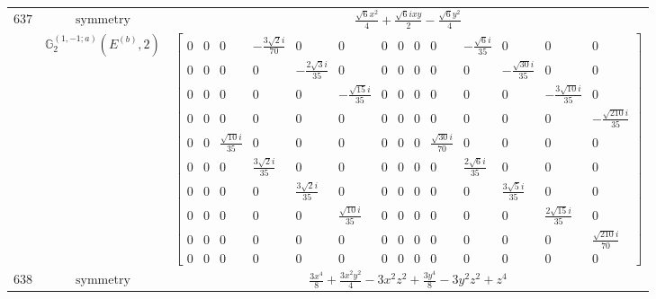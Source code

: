 \documentclass[fleqn,8pt,landscape]{jsarticle}
\begin{document}
\begin{longtable}{ccc}
$ 637 $ & $ \text{symmetry} $ & $ \frac{\sqrt{6} x^{2}}{4} + \frac{\sqrt{6} i x y}{2} - \frac{\sqrt{6} y^{2}}{4} $ \\
$  $ & $ \mathbb{G}_{2}^{(1,-1;a)}(E^{(b)},2) $ & $ \begin{bmatrix} 0 & 0 & 0 & - \frac{3 \sqrt{2} i}{70} & 0 & 0 & 0 & 0 & 0 & 0 & - \frac{\sqrt{6} i}{35} & 0 & 0 & 0 \\ 0 & 0 & 0 & 0 & - \frac{2 \sqrt{3} i}{35} & 0 & 0 & 0 & 0 & 0 & 0 & - \frac{\sqrt{30} i}{35} & 0 & 0 \\ 0 & 0 & 0 & 0 & 0 & - \frac{\sqrt{15} i}{35} & 0 & 0 & 0 & 0 & 0 & 0 & - \frac{3 \sqrt{10} i}{35} & 0 \\ 0 & 0 & 0 & 0 & 0 & 0 & 0 & 0 & 0 & 0 & 0 & 0 & 0 & - \frac{\sqrt{210} i}{35} \\ 0 & 0 & \frac{\sqrt{10} i}{35} & 0 & 0 & 0 & 0 & 0 & 0 & \frac{\sqrt{30} i}{70} & 0 & 0 & 0 & 0 \\ 0 & 0 & 0 & \frac{3 \sqrt{2} i}{35} & 0 & 0 & 0 & 0 & 0 & 0 & \frac{2 \sqrt{6} i}{35} & 0 & 0 & 0 \\ 0 & 0 & 0 & 0 & \frac{3 \sqrt{2} i}{35} & 0 & 0 & 0 & 0 & 0 & 0 & \frac{3 \sqrt{5} i}{35} & 0 & 0 \\ 0 & 0 & 0 & 0 & 0 & \frac{\sqrt{10} i}{35} & 0 & 0 & 0 & 0 & 0 & 0 & \frac{2 \sqrt{15} i}{35} & 0 \\ 0 & 0 & 0 & 0 & 0 & 0 & 0 & 0 & 0 & 0 & 0 & 0 & 0 & \frac{\sqrt{210} i}{70} \\ 0 & 0 & 0 & 0 & 0 & 0 & 0 & 0 & 0 & 0 & 0 & 0 & 0 & 0 \end{bmatrix} $ \\ \hline
$ 638 $ & $ \text{symmetry} $ & $ \frac{3 x^{4}}{8} + \frac{3 x^{2} y^{2}}{4} - 3 x^{2} z^{2} + \frac{3 y^{4}}{8} - 3 y^{2} z^{2} + z^{4} $ \\

\end{longtable}
\end{document}
